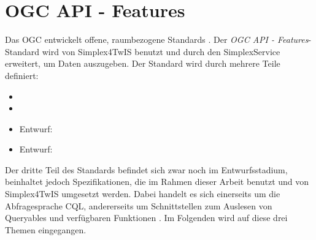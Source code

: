 \section{\acs{OGC} \acs{API} - Features}
\label{section:ogc}

Das \acf{OGC} entwickelt offene, raumbezogene Standards  . Der \textit{OGC API - Features}-Standard wird von Simplex4TwIS benutzt und durch den SimplexService erweitert, um Daten auszugeben. Der Standard wird durch mehrere Teile definiert:
\begin{itemize}
  \item {} 
  \item {} 
  \item Entwurf:  
  \item Entwurf:  
\end{itemize}

Der dritte Teil des Standards befindet sich zwar noch im Entwurfsstadium, beinhaltet jedoch Spezifikationen, die im Rahmen dieser Arbeit benutzt und von Simplex4TwIS umgesetzt werden. Dabei handelt es sich einerseits um die Abfragesprache \acf{CQL}, andererseits um Schnittstellen zum Auslesen von Queryables und verfügbaren Funktionen . Im Folgenden wird auf diese drei Themen eingegangen.
